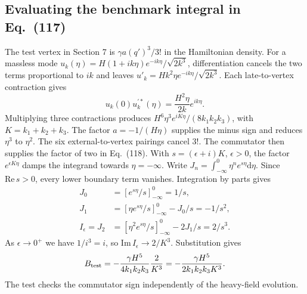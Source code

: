 \documentclass[11pt,a4paper]{article}
\newcommand{\dd}{\mathrm d}
\begin{document}
\subsection{Evaluating the benchmark integral in Eq.~(117)}
The test vertex in Section 7 is $\gamma a(q')^3/3!$ in the Hamiltonian density. For a massless mode $u_k(\eta)=H(1+ik\eta)e^{-ik\eta}/\sqrt{2k^3}$, differentiation cancels the two terms proportional to $ik$ and leaves $u'_k=H k^2\eta e^{-ik\eta}/\sqrt{2k^3}$. Each late-to-vertex contraction gives
\[
 u_k(0)u_k^{\prime *}(\eta)=\frac{H^2\eta}{2k}e^{ik\eta}.
\]
Multiplying three contractions produces $H^6\eta^3 e^{iK\eta}/(8k_1k_2k_3)$, with $K=k_1+k_2+k_3$. The factor $a=-1/(H\eta)$ supplies the minus sign and reduces $\eta^3$ to $\eta^2$. The six external-to-vertex pairings cancel $3!$. The commutator then supplies the factor of two in Eq.~(118).
\clearpage
With $s=(\epsilon+i)K$, $\epsilon>0$, the factor $e^{\epsilon K\eta}$ damps the integrand towards $\eta=-\infty$. Write $J_n=\int_{-\infty}^0\eta^n e^{s\eta}\dd\eta$. Since $\mathrm{Re}\,s>0$, every lower boundary term vanishes. Integration by parts gives
\begin{align}
J_0&=[e^{s\eta}/s]_{-\infty}^0=1/s,\nonumber\\
J_1&=[\eta e^{s\eta}/s]_{-\infty}^0-J_0/s=-1/s^2,\nonumber\\
I_\epsilon=J_2&=[\eta^2 e^{s\eta}/s]_{-\infty}^0-2J_1/s=2/s^3.
\end{align}
As $\epsilon\to0^+$ we have $1/i^3=i$, so $\mathrm{Im}\, I_\epsilon\to2/K^3$. Substitution gives
\[B_{\rm test}=-\frac{\gamma H^5}{4 k_1k_2k_3}\frac{2}{K^3}=-\frac{\gamma H^5}{2 k_1k_2k_3 K^3}.\] The test checks the commutator sign independently of the heavy-field evolution.
\end{document}
